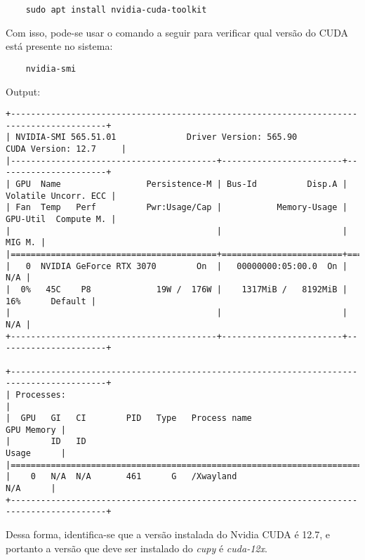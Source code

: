 \documentclass[12pt,a4paper]{article}
\begin{document}
\begin{verbatim}
    sudo apt install nvidia-cuda-toolkit
\end{verbatim}

Com isso, pode-se usar o comando a seguir para verificar qual versão do CUDA está presente no sistema:

\begin{verbatim}
    nvidia-smi
\end{verbatim}

Output:

\begin{verbatim}
+-----------------------------------------------------------------------------------------+
| NVIDIA-SMI 565.51.01              Driver Version: 565.90         CUDA Version: 12.7     |
|-----------------------------------------+------------------------+----------------------+
| GPU  Name                 Persistence-M | Bus-Id          Disp.A | Volatile Uncorr. ECC |
| Fan  Temp   Perf          Pwr:Usage/Cap |           Memory-Usage | GPU-Util  Compute M. |
|                                         |                        |               MIG M. |
|=========================================+========================+======================|
|   0  NVIDIA GeForce RTX 3070        On  |   00000000:05:00.0  On |                  N/A |
|  0%   45C    P8             19W /  176W |    1317MiB /   8192MiB |     16%      Default |
|                                         |                        |                  N/A |
+-----------------------------------------+------------------------+----------------------+
                                                                                         
+-----------------------------------------------------------------------------------------+
| Processes:                                                                              |
|  GPU   GI   CI        PID   Type   Process name                              GPU Memory |
|        ID   ID                                                               Usage      |
|=========================================================================================|
|    0   N/A  N/A       461      G   /Xwayland                                   N/A      |
+-----------------------------------------------------------------------------------------+
\end{verbatim}

Dessa forma, identifica-se que a versão instalada do Nvidia CUDA é 12.7, e portanto a versão que deve ser instalado do \emph{cupy} é \emph{cuda-12x}.
\end{document}
